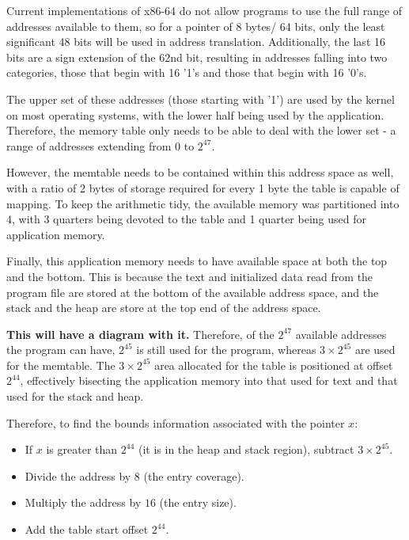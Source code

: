 Current implementations of x86-64 do not allow programs to use the full range of addresses available to them, so for a pointer of 8 bytes/ 64 bits, only the least significant 48 bits will be used in address translation.
Additionally, the last 16 bits are a sign extension of the 62nd bit, resulting in addresses falling into two categories, those that begin with 16 '1's and those that begin with 16 '0's.

The upper set of these addresses (those starting with '1') are used by the kernel on most operating systems, with the lower half being used by the application.
Therefore, the memory table only needs to be able to deal with the lower set - a range of addresses extending from $0$ to $2^{47}$.

However, the memtable needs to be contained within this address space as well, with a ratio of 2 bytes of storage required for every 1 byte the table is capable of mapping.
To keep the arithmetic tidy, the available memory was partitioned into 4, with 3 quarters being devoted to the table and 1 quarter being used for application memory.

Finally, this application memory needs to have available space at both the top and the bottom.
This is because the text and initialized data read from the program file are stored at the bottom of the available address space, and the stack and the heap are store at the top end of the address space.

\textbf{This will have a diagram with it.} Therefore, of the $2^{47}$ available addresses the program can have, $2^{45}$ is still used for the program, whereas $3\times 2^{45}$ are used for the memtable.
The $3\times 2^{45}$ area allocated for the table is positioned at offset $2^{44}$, effectively bisecting the application memory into that used for text and that used for the stack and heap.

Therefore, to find the bounds information associated with the pointer $x$:

\begin{itemize}
\item If $x$ is greater than $2^{44}$ (it is in the heap and stack region), subtract $3\times 2^{45}$.
\item Divide the address by $8$ (the entry coverage).
\item Multiply the address by $16$ (the entry size).
\item Add the table start offset $2^{44}$.
\end{itemize}

